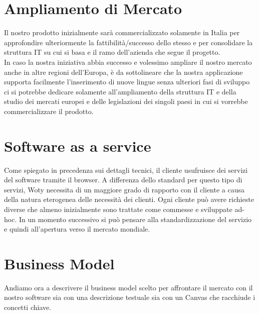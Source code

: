 \section{Ampliamento di Mercato}
Il nostro prodotto inizialmente sarà commercializzato solamente in Italia per approfondire ulteriormente la fattibilità/successo dello stesso e per consolidare la struttura IT su cui si basa e il ramo dell'azienda che segue il progetto.\\
In caso la nostra iniziativa abbia successo e volessimo ampliare il nostro mercato anche in altre regioni
dell'Europa, è da sottolineare che la nostra applicazione supporta facilmente l'inserimento di nuove lingue senza ulteriori fasi di sviluppo ci si potrebbe dedicare solamente all'ampliamento della struttura IT e della studio dei mercati europei e delle legislazioni dei singoli paesi in cui si vorrebbe commercializzare il prodotto.

\section{Software as a service}
Come spiegato in precedenza sui dettagli tecnici, il cliente usufruisce dei servizi del software tramite il browser. A differenza dello standard per questo tipo di servizi, Woty necessita di un maggiore grado di rapporto con il cliente a causa della natura eterogenea delle necessità dei clienti. Ogni cliente può avere richieste diverse che almeno inizialmente sono trattate come commesse e sviluppate ad-hoc. In un momento successivo si può pensare alla standardizzazione del servizio e quindi all'apertura verso il mercato mondiale.




\section{Business Model}
Andiamo ora a descrivere il business model scelto per affrontare il mercato con il nostro software sia con una descrizione testuale sia con un Canvas che racchiude i concetti chiave.

